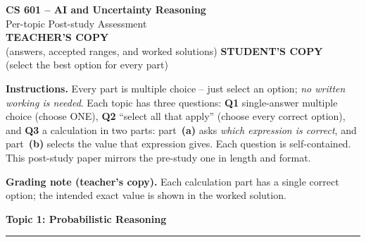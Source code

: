 \documentclass[answers,addpoints]{exam}
\newcommand{\topic}[2]{%
  \vspace{1.0\baselineskip}%
  \noindent\textbf{\large Topic #1: #2}\par
  \noindent\rule{\linewidth}{0.4pt}\par
  \vspace{0.4\baselineskip}}
\begin{document}
\begin{center}
  {\LARGE\bfseries CS 601 -- AI and Uncertainty Reasoning}\\[4pt]
  {\Large Per-topic Post-study Assessment}\\[6pt]
  {\large \ifprintanswers \textbf{TEACHER'S COPY}\\(answers, accepted ranges, and worked solutions)%
          \else \textbf{STUDENT'S COPY}\\(select the best option for every part)\fi}
\end{center}

\vspace{0.5\baselineskip}
\noindent
\textbf{Instructions.} Every part is multiple choice -- just select an option;
\emph{no written working is needed}. Each topic has three questions:
\textbf{Q1} single-answer multiple choice (choose ONE),
\textbf{Q2} ``select all that apply'' (choose every correct option), and
\textbf{Q3} a calculation in two parts: part~\textbf{(a)} asks \emph{which
expression is correct}, and part~\textbf{(b)} selects the value that expression
gives. Each question is self-contained. This post-study paper mirrors the
pre-study one in length and format.

\ifprintanswers
\noindent\textbf{Grading note (teacher's copy).} Each calculation part has a
single correct option; the intended exact value is shown in the worked solution.
\fi

\vspace{0.5\baselineskip}

\topic{1}{Probabilistic Reasoning}
\end{document}
